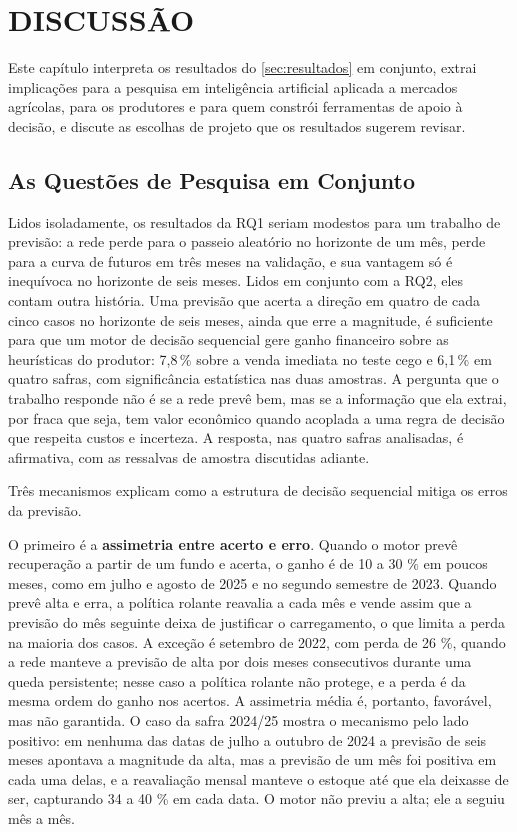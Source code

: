 \chapter{\MakeUppercase{Discussão}}\label{sec:discussao}

Este capítulo interpreta os resultados do \autoref{sec:resultados} em conjunto, extrai implicações para a pesquisa em inteligência artificial aplicada a mercados agrícolas, para os produtores e para quem constrói ferramentas de apoio à decisão, e discute as escolhas de projeto que os resultados sugerem revisar.

\section{As Questões de Pesquisa em Conjunto}\label{sec2:disc-rqs}

Lidos isoladamente, os resultados da RQ1 seriam modestos para um trabalho de previsão: a rede perde para o passeio aleatório no horizonte de um mês, perde para a curva de futuros em três meses na validação, e sua vantagem só é inequívoca no horizonte de seis meses. Lidos em conjunto com a RQ2, eles contam outra história. Uma previsão que acerta a direção em quatro de cada cinco casos no horizonte de seis meses, ainda que erre a magnitude, é suficiente para que um motor de decisão sequencial gere ganho financeiro sobre as heurísticas do produtor: 7,8\,\% sobre a venda imediata no teste cego e 6,1\,\% em quatro safras, com significância estatística nas duas amostras. A pergunta que o trabalho responde não é se a rede prevê bem, mas se a informação que ela extrai, por fraca que seja, tem valor econômico quando acoplada a uma regra de decisão que respeita custos e incerteza. A resposta, nas quatro safras analisadas, é afirmativa, com as ressalvas de amostra discutidas adiante.

Três mecanismos explicam como a estrutura de decisão sequencial mitiga os erros da previsão.

O primeiro é a \textbf{assimetria entre acerto e erro}. Quando o motor prevê recuperação a partir de um fundo e acerta, o ganho é de 10 a 30 \% em poucos meses, como em julho e agosto de 2025 e no segundo semestre de 2023. Quando prevê alta e erra, a política rolante reavalia a cada mês e vende assim que a previsão do mês seguinte deixa de justificar o carregamento, o que limita a perda na maioria dos casos. A exceção é setembro de 2022, com perda de 26 \%, quando a rede manteve a previsão de alta por dois meses consecutivos durante uma queda persistente; nesse caso a política rolante não protege, e a perda é da mesma ordem do ganho nos acertos. A assimetria média é, portanto, favorável, mas não garantida. O caso da safra 2024/25 mostra o mecanismo pelo lado positivo: em nenhuma das datas de julho a outubro de 2024 a previsão de seis meses apontava a magnitude da alta, mas a previsão de um mês foi positiva em cada uma delas, e a reavaliação mensal manteve o estoque até que ela deixasse de ser, capturando 34 a 40 \% em cada data. O motor não previu a alta; ele a seguiu mês a mês.

